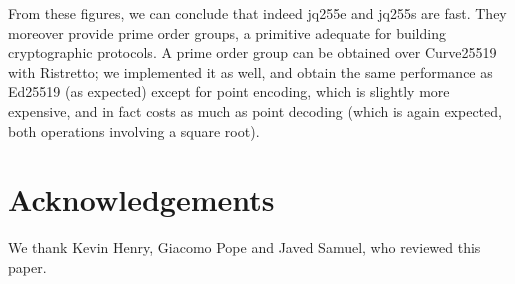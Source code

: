 \documentclass{llncs}
\begin{document}
From these figures, we can conclude that indeed jq255e and jq255s are
fast. They moreover provide prime order groups, a primitive adequate for
building cryptographic protocols. A prime order group can be obtained
over Curve25519 with Ristretto\cite{RistrettoWeb}; we implemented it as
well, and obtain the same performance as Ed25519 (as expected) except
for point encoding, which is slightly more expensive, and in fact costs
as much as point decoding (which is again expected, both operations
involving a square root).


\section*{Acknowledgements}

We thank Kevin Henry, Giacomo Pope and Javed Samuel, who reviewed this paper.
\end{document}
